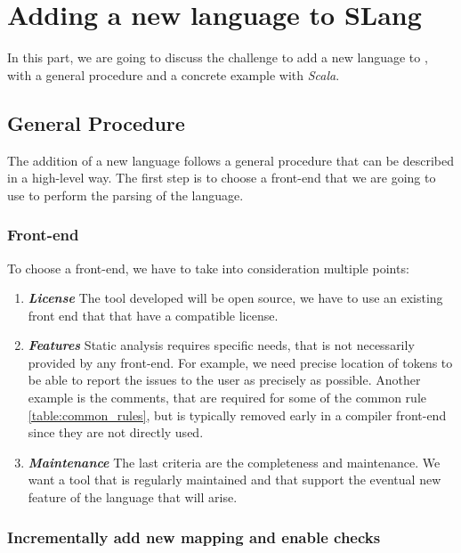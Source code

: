 \section{Adding a new language to SLang}
\label{sec:new_language}

In this part, we are going to discuss the challenge to add a new language to \slang{}, with a general procedure and a concrete example with \emph{Scala}.

\subsection{General Procedure}
\label{subsec:general_procedure}

The addition of a new language follows a general procedure that can be described in a high-level way.
The first step is to choose a front-end that we are going to use to perform the parsing of the language.

\subsubsection{Front-end}
\label{subsubsec:front_end}

To choose a front-end, we have to take into consideration multiple points:
\begin{enumerate}
	\item \textbf{\textit{License}} \newline The tool developed will be open source, we have to use an existing front end that that have a compatible license.
	\item \textbf{\textit{Features}} \newline Static analysis requires specific needs, that is not necessarily provided by any front-end. 	For example, we need precise location of tokens to be able to report the issues to the user as precisely as possible. Another example is the comments, that are required for some of the common rule \ref{table:common_rules}, but is typically removed early in a compiler front-end since they are not directly used.
	\item \textbf{\textit{Maintenance}} \newline 
	The last criteria are the completeness and maintenance. We want a tool that is regularly maintained and that support the eventual new feature of the language that will arise. 
\end{enumerate}

\subsubsection{Incrementally add new mapping and enable checks}
\label{subsubsec:new_mapping_and_enables_rules}


